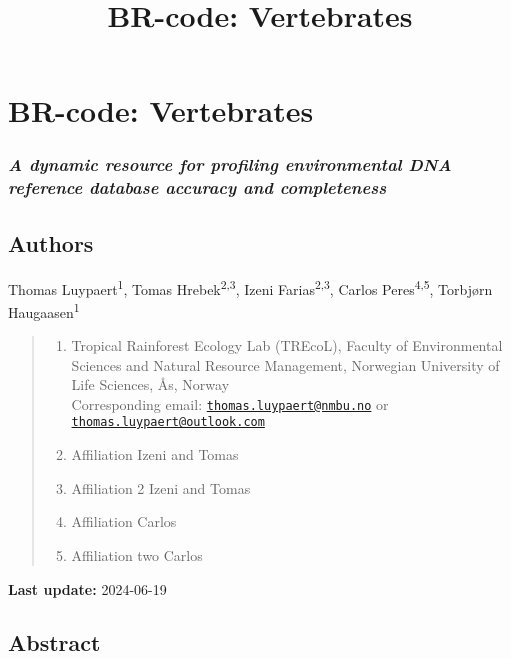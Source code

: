 \documentclass[
  letterpaper,
  DIV=11,
  numbers=noendperiod]{scrartcl}
\title{BR-code: Vertebrates}
\author{}
\date{}
\begin{document}
\maketitle

\section{BR-code: Vertebrates}\label{br-code-vertebrates}

\subsubsection{\texorpdfstring{\emph{A dynamic resource for profiling
environmental DNA reference database accuracy and
completeness}}{A dynamic resource for profiling environmental DNA reference database accuracy and completeness}}\label{a-dynamic-resource-for-profiling-environmental-dna-reference-database-accuracy-and-completeness}

\subsection{Authors}\label{authors}

Thomas Luypaert\textsuperscript{1}, Tomas Hrebek\textsuperscript{2,3},
Izeni Farias\textsuperscript{2,3}, Carlos Peres\textsuperscript{4,5},
Torbjørn Haugaasen\textsuperscript{1}

\begin{quote}
\begin{enumerate}
\def\labelenumi{(\arabic{enumi})}
\item
  Tropical Rainforest Ecology Lab (TREcoL), Faculty of Environmental
  Sciences and Natural Resource Management, Norwegian University of Life
  Sciences, Ås, Norway\\
  Corresponding email:
  \href{mailto:thomas.luypaert@nmbu.no}{\nolinkurl{thomas.luypaert@nmbu.no}}
  or
  \href{mailto:thomas.luypaert@outlook.com}{\nolinkurl{thomas.luypaert@outlook.com}}
\item
  Affiliation Izeni and Tomas
\item
  Affiliation 2 Izeni and Tomas
\item
  Affiliation Carlos
\item
  Affiliation two Carlos
\end{enumerate}
\end{quote}

\textbf{Last update:} 2024-06-19

\subsection{Abstract}\label{abstract}
\end{document}
